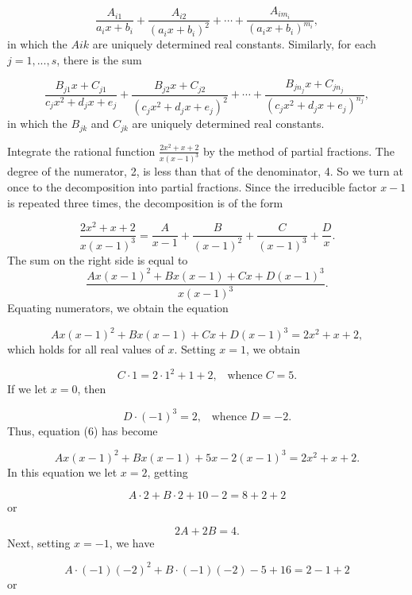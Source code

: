 $$
\frac{A_{i1}}{a_{i}x + b_{i}} + \frac{A_{i2}}{(a_{i}x + b_{i})^2} + \cdots + \frac{A_{im_i}}{(a_{i}x + b_{i})^{m_i}},  
$$
\noindent in which the $Aik$ are uniquely determined real constants. Similarly, for each $j = 1, ... , s$, there is the sum

$$
\frac{B_{j1}x + C_{j1}}{c_{j}x^2+ d_{j}x + e_{j}}  
+ \frac{B_{j2}x + C_{j2}}{(c_{j}x^2 + d_{j}x + e_{j})^2}
+ \cdots
+ \frac{B_{jn_j}x + C_{jn_j}} {(c_{j}x^2 + d_{j}x + e_{j})^{n_j}},
$$
\noindent in which the $B_{jk}$ and $C_{jk}$ are uniquely
determined real constants.

\begin{example}
Integrate the rational function $\frac{2x^2 + x + 2}{x(x - 1)^3}$ by the method of partial fractions. The degree of the numerator, 2, is less than that of the denominator, 4. So we turn at once to the decomposition into partial fractions. Since the irreducible factor $x - 1$ is repeated three times, the decomposition is of the form

$$
\frac{2x^2 + x + 2}{x(x - 1)^3} 
= \frac{A}{x - 1} + \frac{B}{(x - 1)^2} + \frac{C}{(x - 1)^3} + \frac{D}{x}.
$$
\noindent The sum on the right side is equal to
$$
\frac{Ax(x - 1)^2 + Bx(x - 1) + Cx + D(x -1)^3}{x(x - 1)^3}.
$$
\noindent Equating numerators, we obtain the equation

\begin{equation}
Ax(x - 1)^2 + Bx(x - 1) + Cx + D(x - 1)^3 = 2x^2 + x + 2,
\label{eq7.4.6}
\end{equation}
\noindent which holds for all real values of $x$. Setting $x = 1$, we obtain 

$$
C \cdot 1 = 2 \cdot 1^2 + 1 + 2, \;\;\;\mbox{whence}\; C = 5.
$$
\noindent If we let $x = 0$, then 

$$
D \cdot ( - 1)^3 = 2, \;\;\; \mbox{whence}\; D = - 2. 
$$
\noindent Thus, equation (6) has become

$$
Ax(x - 1)^2 + Bx(x - 1) + 5x -2(x - 1)^3 = 2x^2 + x + 2.
$$
\noindent In this equation we let $x = 2$, getting 

$$
A \cdot 2 + B \cdot 2 + 10 - 2 = 8 + 2 + 2
$$
\noindent or 

\begin{equation}
2A + 2B = 4.  
\label{eq7.4.7}
\end{equation}
\noindent Next, setting $x = - 1$, we have 

$$
A \cdot (- 1)(- 2)^2 + B \cdot (- 1)(- 2) - 5 + 16 = 2 - 1 + 2
$$
\noindent or 


\end{example}
